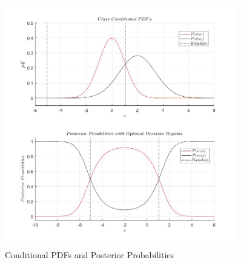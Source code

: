 \documentclass[12pt]{article}
\begin{document}
\begin{figure}
\centering
\includegraphics[width=0.9\textwidth]{12b.jpg}\caption{\label{fig2}Conditional PDFs and Posterior Probabilities}
\end{figure}
\end{document}
